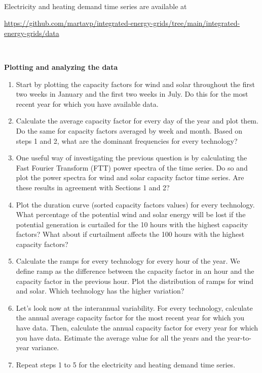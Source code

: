 \documentclass[10pt]{article}
\newenvironment{problem}[2][Problem]{\begin{trivlist}
\item[\hskip \labelsep {\bfseries #1}\hskip \labelsep {\bfseries #2.}]}{\end{trivlist}}
\begin{document}
\begin{problem}{1.1. Analyzing solar and wind generation time series}
\

Electricity and heating demand time series are available at

\url{https://github.com/martavp/integrated-energy-grids/tree/main/integrated-energy-grids/data}

\

\textbf{Plotting and analyzing the data}

\begin{enumerate}

\item Start by plotting the capacity factors for wind and solar throughout the first two weeks in January and the first two weeks in July. Do this for the most recent year for which you have available data.  

\item Calculate the average capacity factor for every day of the year and plot them. Do the same for capacity factors averaged by week and month. Based on steps 1 and 2, what are the dominant frequencies for every technology?

\item One useful way of investigating the previous question is by calculating the Fast Fourier Transform (FTT) power spectra of the time series. Do so and plot the power spectra for wind and solar capacity factor time series. Are these results in agreement with Sections 1 and 2?

\item Plot the duration curve (sorted capacity factors values) for every technology. What percentage of the potential wind and solar energy will be lost if the potential generation is curtailed for the 10 hours with the highest capacity factors? What about if curtailment affects the 100 hours with the highest capacity factors?

\item Calculate the ramps for every technology for every hour of the year. We define ramp as the difference between the capacity factor in an hour and the capacity factor in the previous hour. Plot the distribution of ramps for wind and solar. Which technology has the higher variation?

\item Let’s look now at the interannual variability. For every technology, calculate the annual average capacity factor for the most recent year for which you have data. Then, calculate the annual capacity factor for every year for which you have data. Estimate the average value for all the years and the year-to-year variance.

\item Repeat steps 1 to 5 for the electricity and heating demand time series. 

\end{enumerate}

\end{problem}
\end{document}
